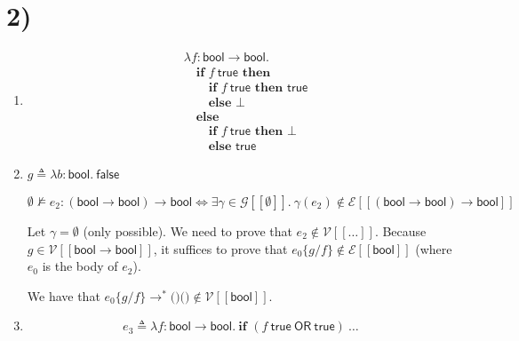 \documentclass[11pt]{article}
\newcommand{\bool}{\mathsf{bool}}
\newcommand{\true}{\mathsf{true}}
\newcommand{\false}{\mathsf{false}}
\newcommand{\V}{\mathcal{V}}
\newcommand{\E}{\mathcal{E}}
\newcommand{\G}{\mathcal{G}}
\begin{document}
\section*{2)}
\begin{enumerate}[label=\alph*.]
  \item
  \begin{align*}
    &\lambda f : \bool \to \bool.\\
    &\quad \textbf{if } f\ \true \textbf{ then}\\
    &\qquad \textbf{if } f\ \true \textbf{ then } \true\\
    &\qquad \textbf{else } \bot\\
    &\quad \textbf{else}\\
    &\qquad \textbf{if } f\ \true \textbf{ then } \bot\\
    &\qquad \textbf{else } \true
  \end{align*}

  \item $g \triangleq \lambda b : \bool.\ \false$

  \[
    \emptyset \not\vDash e_2 : (\bool \to \bool) \to \bool
    \iff
    \exists \gamma \in \G[\![\emptyset]\!].\ \gamma(e_2) \notin \E[\![(\bool \to \bool) \to \bool]\!]
  \]

  Let $\gamma = \emptyset$ (only possible).
  We need to prove that $e_2 \notin \V[\![\ldots]\!]$.
  Because $g \in \V[\![\bool \to \bool]\!]$, it suffices to prove that
  $e_0\{g/f\} \notin \E[\![\bool]\!]$
  (where $e_0$ is the body of $e_2$).

  We have that $e_0\{g/f\} \to^{*} \texttt{()()} \notin \V[\![\bool]\!]$.

  \item
  \[
    e_3 \triangleq \lambda f : \bool \to \bool.\ \textbf{if } (f\ \true \ \mathsf{OR}\ \true)\ \ldots
  \]
\end{enumerate}

\end{document}
